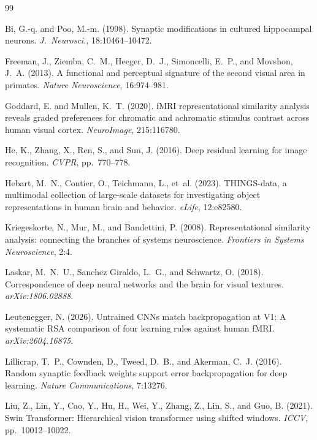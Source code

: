 \documentclass[10pt,twocolumn]{article}
\begin{document}

\begin{thebibliography}{99}

Bi, G.-q. and Poo, M.-m. (1998). Synaptic modifications in cultured hippocampal neurons. \textit{J.\ Neurosci.}, 18:10464--10472.

Freeman, J., Ziemba, C.~M., Heeger, D.~J., Simoncelli, E.~P., and Movshon, J.~A. (2013). A functional and perceptual signature of the second visual area in primates. \textit{Nature Neuroscience}, 16:974--981.

 Goddard, E. and Mullen, K.~T. (2020). fMRI representational similarity analysis reveals graded preferences for chromatic and achromatic stimulus contrast across human visual cortex. \textit{NeuroImage}, 215:116780.

He, K., Zhang, X., Ren, S., and Sun, J. (2016). Deep residual learning for image recognition. \textit{CVPR}, pp.~770--778.

Hebart, M.~N., Contier, O., Teichmann, L., et~al. (2023). THINGS-data, a multimodal collection of large-scale datasets for investigating object representations in human brain and behavior. \textit{eLife}, 12:e82580.

Kriegeskorte, N., Mur, M., and Bandettini, P. (2008). Representational similarity analysis: connecting the branches of systems neuroscience. \textit{Frontiers in Systems Neuroscience}, 2:4.

 Laskar, M.~N.~U., Sanchez Giraldo, L.~G., and Schwartz, O. (2018). Correspondence of deep neural networks and the brain for visual textures. \textit{arXiv:1806.02888}.

Leutenegger, N. (2026). Untrained CNNs match backpropagation at V1: A systematic RSA comparison of four learning rules against human fMRI. \textit{arXiv:2604.16875}.

Lillicrap, T.~P., Cownden, D., Tweed, D.~B., and Akerman, C.~J. (2016). Random synaptic feedback weights support error backpropagation for deep learning. \textit{Nature Communications}, 7:13276.

Liu, Z., Lin, Y., Cao, Y., Hu, H., Wei, Y., Zhang, Z., Lin, S., and Guo, B. (2021). Swin Transformer: Hierarchical vision transformer using shifted windows. \textit{ICCV}, pp.~10012--10022.


\end{thebibliography}
\end{document}
